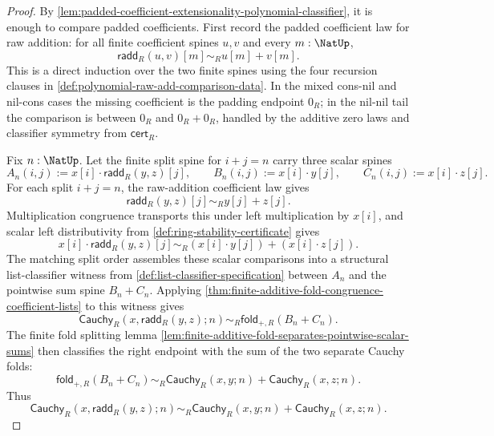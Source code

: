 \begin{proof}
By \autoref{lem:padded-coefficient-extensionality-polynomial-classifier}, it is enough to compare padded coefficients. First record the padded coefficient law for raw addition: for all finite coefficient spines $u,v$ and every $m:\NatUp$,
$$
\mathsf{radd}_R(u,v)[m]\sim_Ru[m]+v[m].
$$
This is a direct induction over the two finite spines using the four recursion clauses in \autoref{def:polynomial-raw-add-comparison-data}. In the mixed cons-nil and nil-cons cases the missing coefficient is the padding endpoint $0_R$; in the nil-nil tail the comparison is between $0_R$ and $0_R+0_R$, handled by the additive zero laws and classifier symmetry from $\mathsf{cert}_R$.

Fix $n:\NatUp$. Let the finite split spine for $i+j=n$ carry three scalar spines
$$
A_n(i,j):=x[i]\cdot\mathsf{radd}_R(y,z)[j],
\qquad
B_n(i,j):=x[i]\cdot y[j],
\qquad
C_n(i,j):=x[i]\cdot z[j].
$$
For each split $i+j=n$, the raw-addition coefficient law gives
$$
\mathsf{radd}_R(y,z)[j]\sim_Ry[j]+z[j].
$$
Multiplication congruence transports this under left multiplication by $x[i]$, and scalar left distributivity from \autoref{def:ring-stability-certificate} gives
$$
x[i]\cdot\mathsf{radd}_R(y,z)[j]
\sim_R
(x[i]\cdot y[j])+(x[i]\cdot z[j]).
$$
The matching split order assembles these scalar comparisons into a structural list-classifier witness from \autoref{def:list-classifier-specification} between $A_n$ and the pointwise sum spine $B_n+C_n$. Applying \autoref{thm:finite-additive-fold-congruence-coefficient-lists} to this witness gives
$$
\mathsf{Cauchy}_R(x,\mathsf{radd}_R(y,z);n)
\sim_R
\mathsf{fold}_{+,R}(B_n+C_n).
$$
The finite fold splitting lemma \autoref{lem:finite-additive-fold-separates-pointwise-scalar-sums} then classifies the right endpoint with the sum of the two separate Cauchy folds:
$$
\mathsf{fold}_{+,R}(B_n+C_n)
\sim_R
\mathsf{Cauchy}_R(x,y;n)+\mathsf{Cauchy}_R(x,z;n).
$$
Thus
$$
\mathsf{Cauchy}_R(x,\mathsf{radd}_R(y,z);n)
\sim_R
\mathsf{Cauchy}_R(x,y;n)+\mathsf{Cauchy}_R(x,z;n).
$$


\end{proof}
